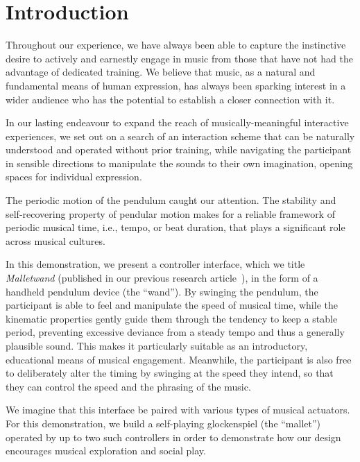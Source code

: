 \documentclass[manuscript,review]{acmart}
\begin{document}
\maketitle

\section{Introduction}

Throughout our experience, we have always been able to capture the instinctive desire to actively and earnestly engage in music from those that have not had the advantage of dedicated training. We believe that music, as a natural and fundamental means of human expression, has always been sparking interest in a wider audience who has the potential to establish a closer connection with it.

In our lasting endeavour to expand the reach of musically-meaningful interactive experiences, we set out on a search of an interaction scheme that can be naturally understood and operated without prior training, while navigating the participant in sensible directions to manipulate the sounds to their own imagination, opening spaces for individual expression.

The periodic motion of the pendulum caught our attention. The stability and self-recovering property of pendular motion makes for a reliable framework of periodic musical time, i.e., tempo, or beat duration, that plays a significant role across musical cultures.

In this demonstration, we present a controller interface, which we title \textit{Malletwand} (published in our previous research article~\cite{nime2024_59}), in the form of a handheld pendulum device (the ``wand''). By swinging the pendulum, the participant is able to feel and manipulate the speed of musical time, while the kinematic properties gently guide them through the tendency to keep a stable period, preventing excessive deviance from a steady tempo and thus a generally plausible sound. This makes it particularly suitable as an introductory, educational means of musical engagement. Meanwhile, the participant is also free to deliberately alter the timing by swinging at the speed they intend, so that they can control the speed and the phrasing of the music.

We imagine that this interface be paired with various types of musical actuators. For this demonstration, we build a self-playing glockenspiel (the ``mallet'') operated by up to two such controllers in order to demonstrate how our design encourages musical exploration and social play.
\end{document}

